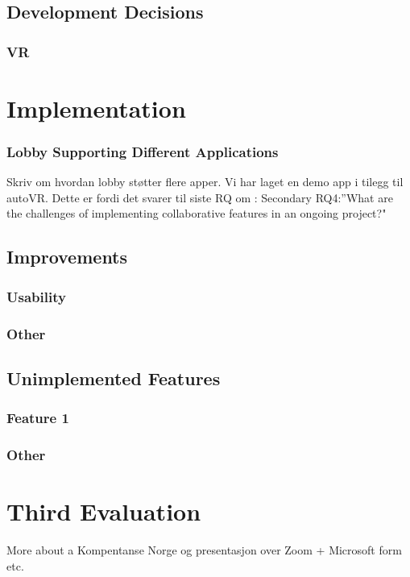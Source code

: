 \subsection{Development Decisions}
\subsubsection{VR}

\section{Implementation}

\subsubsection{Lobby Supporting Different Applications}
Skriv om hvordan lobby støtter flere apper. Vi har laget en demo app i tilegg til autoVR. Dette er fordi det svarer til siste RQ om : Secondary RQ4:”What  are  the  challenges  of  implementing  collaborative  features  in  an  ongoing project?"



\subsection{Improvements}
\subsubsection{Usability}
\subsubsection{Other}

\subsection{Unimplemented Features}
\subsubsection{Feature 1}
\subsubsection{Other}


\section{Third Evaluation}
More about a Kompentanse Norge og presentasjon over Zoom + Microsoft form etc. 

